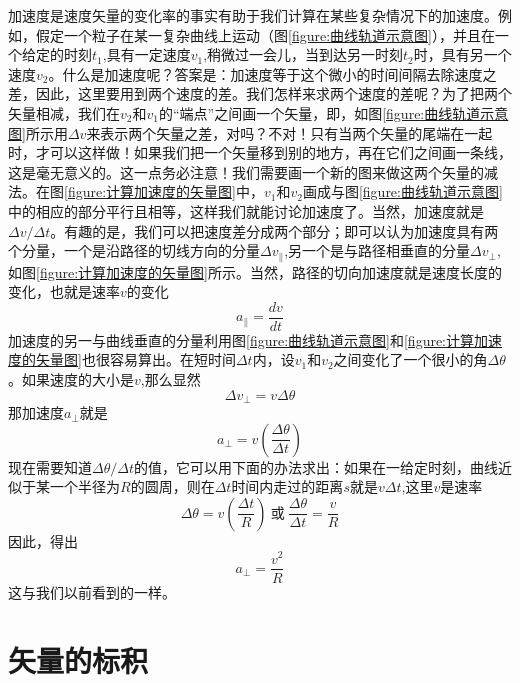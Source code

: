 加速度是速度矢量的变化率的事实有助于我们计算在某些复杂情况下的加速度。例如，假定一个粒子在某一复杂曲线上运动（图\ref{figure:曲线轨道示意图}），并且在一个给定的时刻$t_1$,具有一定速度$v_1$,稍微过一会儿，当到达另一时刻$t_2$时，具有另一个速度$v_2$。什么是加速度呢？答案是：加速度等于这个微小的时间间隔去除速度之差，因此，这里要用到两个速度的差。我们怎样来求两个速度的差呢？为了把两个矢量相减，我们在$v_2$和$v_1$的“端点”之间画一个矢量，即，如图\ref{figure:曲线轨道示意图}所示用$\Delta v$来表示两个矢量之差，对吗？不对！只有当两个矢量的尾端在一起时，才可以这样做！如果我们把一个矢量移到别的地方，再在它们之间画一条线，这是毫无意义的。这一点务必注意！我们需要画一个新的图来做这两个矢量的减法。在图\ref{figure:计算加速度的矢量图}中，$v_1$和$v_2$画成与图\ref{figure:曲线轨道示意图}中的相应的部分平行且相等，这样我们就能讨论加速度了。当然，加速度就是$\Delta v/\Delta t$。有趣的是，我们可以把速度差分成两个部分；即可以认为加速度具有两个分量，一个是沿路径的切线方向的分量$\Delta v_{\parallel}$,另一个是与路径相垂直的分量$\Delta v_{\bot}$,如图\ref{figure:计算加速度的矢量图}所示。当然，路径的切向加速度就是速度长度的变化，也就是速率$v$的变化
\begin{equation}
    \label{Eq:I:11:15}
    a_{\parallel}=\frac{dv}{dt}
\end{equation}
加速度的另一与曲线垂直的分量利用图\ref{figure:曲线轨道示意图}和\ref{figure:计算加速度的矢量图}也很容易算出。在短时间$\Delta t$内，设$v_1$和$v_2$之间变化了一个很小的角$\Delta \theta$。如果速度的大小是$v$,那么显然
\begin{equation*}
    \Delta v_{\bot}=v \Delta \theta
\end{equation*}
那加速度$a_{\bot}$就是
\begin{equation*}
    a_{\bot}=v(\frac{\Delta \theta}{\Delta t})
\end{equation*}
现在需要知道$\Delta \theta/\Delta t$的值，它可以用下面的办法求出：如果在一给定时刻，曲线近似于某一个半径为$R$的圆周，则在$\Delta t$时间内走过的距离$s$就是$v \Delta t$,这里$v$是速率
\begin{equation*}
    \Delta \theta =v(\frac{\Delta t}{R})~\text{或}~\frac{\Delta \theta}{\Delta t}=\frac{v}{R}
\end{equation*}
因此，得出
\begin{equation}
    \label{Eq:I:11:16}
    a_{\bot}=\frac{v^2}{R}
\end{equation}
这与我们以前看到的一样。

\section{矢量的标积}

